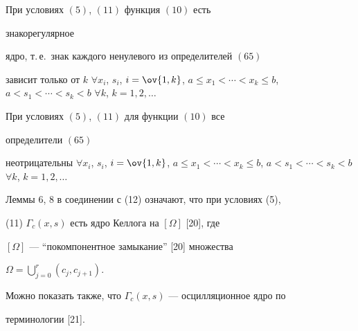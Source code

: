  


\begin{lem} При условиях $(5)$, $(11)$ функция $(10)$ есть 


знакорегулярное 


ядро, т.\,е.~знак каждого ненулевого из определителей $(65)$ 


зависит только от $k$ $\forall x_i$, $s_i$, $i=\ov{1,k}$, $a\le 


x_1<\dotsb<x_k\le b$, $a<s_1<\dotsb<s_k<b$ $\forall k$, $k=1,2,\dotsc$ 


\end{lem} 


 


\begin{lem} При условиях $(5)$, $(11)$ для функции $(10)$  все 


определители $(65)$ 


неотрицательны $\forall x_i$, $s_i$, $i=\ov{1,k}$, $a\le 


x_1<\dotsb<x_k\le b$, $a<s_1<\dotsb<s_k<b$ $\forall k$, $k=1,2,\dotsc$ 


\end{lem} 


 


Леммы 6, 8 в соединении с (12) означают, что при условиях (5), 


(11) $\Gamma_c(x,s)$ есть ядро Келлога на $[\Omega]$ [20], где 


$[\Omega]$ --- ``покомпонентное замыкание'' [20] множества 


$\Omega=\bigcup\limits^r_{j=0}(c_j,c_{j+1})$. 


Можно показать также, что $\Gamma_c(x,s)$ --- осцилляционное ядро по 


терминологии [21]. 


 


